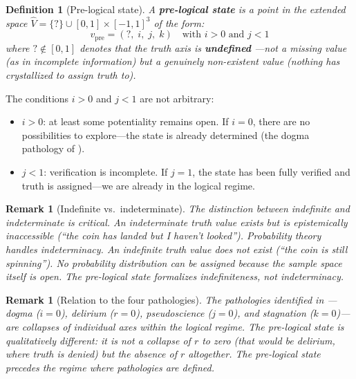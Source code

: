 \documentclass[11pt,a4paper]{article}
\newtheorem{definition}[theorem]{Definition}
\newtheorem{remark}[theorem]{Remark}
\begin{document}
\begin{definition}[Pre-logical state]
\label{def:prelogical}
A \textbf{pre-logical state} is a point in the extended space
$\hat{V} = \{?\} \cup [0,1] \times [-1,1]^3$ of the form:
\begin{equation}
v_{\mathrm{pre}} = (?, \; i, \; j, \; k)
  \quad\text{with } i > 0 \text{ and } j < 1
\end{equation}
where $? \notin [0,1]$ denotes that the truth axis is \textbf{undefined}
---not a missing value (as in incomplete information) but a genuinely
non-existent value (nothing has crystallized to assign truth to).
\end{definition}

The conditions $i > 0$ and $j < 1$ are not arbitrary:
\begin{itemize}[nosep]
\item $i > 0$: at least some potentiality remains open. If $i = 0$,
  there are no possibilities to explore---the state is already determined
  (the dogma pathology of \citealt{p11}).
\item $j < 1$: verification is incomplete. If $j = 1$, the state has
  been fully verified and truth is assigned---we are already in the
  logical regime.
\end{itemize}

\begin{remark}[Indefinite vs.\ indeterminate]
\label{rem:indefinite}
The distinction between \emph{indefinite} and \emph{indeterminate} is
critical. An indeterminate truth value exists but is epistemically
inaccessible (``the coin has landed but I haven't looked'').
Probability theory handles indeterminacy. An indefinite truth value
does not exist (``the coin is still spinning''). No probability
distribution can be assigned because the sample space itself is open.
The pre-logical state formalizes indefiniteness, not indeterminacy.
\end{remark}

\begin{remark}[Relation to the four pathologies]
\label{rem:pathologies}
The pathologies identified in \citet{p11}---dogma ($i = 0$), delirium
($r = 0$), pseudoscience ($j = 0$), and stagnation ($k = 0$)---are
collapses of individual axes within the logical regime. The pre-logical
state is qualitatively different: it is not a collapse of $r$ to zero
(that would be delirium, where truth is denied) but the
\emph{absence} of $r$ altogether. The pre-logical state precedes the
regime where pathologies are defined.
\end{remark}
\end{document}
